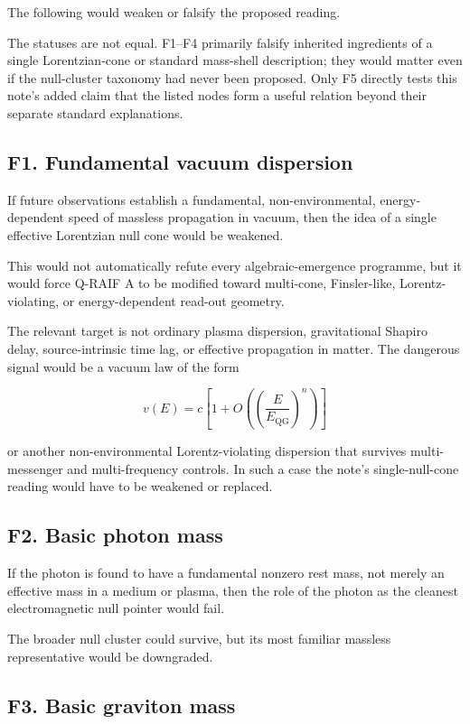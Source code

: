 \documentclass[12pt,a4paper]{article}
\theoremstyle{definition}
\theoremstyle{remark}
\begin{document}
The following would weaken or falsify the proposed reading.

The statuses are not equal.  F1--F4 primarily falsify inherited ingredients of a single Lorentzian-cone or standard mass-shell description; they would matter even if the null-cluster taxonomy had never been proposed.  Only F5 directly tests this note's added claim that the listed nodes form a useful relation beyond their separate standard explanations.

\subsection{F1. Fundamental vacuum
dispersion}\label{f1.-fundamental-vacuum-dispersion}

If future observations establish a fundamental, non-environmental,
energy-dependent speed of massless propagation in vacuum, then the idea
of a single effective Lorentzian null cone would be weakened.

This would not automatically refute every algebraic-emergence programme,
but it would force Q-RAIF A to be modified toward multi-cone,
Finsler-like, Lorentz-violating, or energy-dependent read-out geometry.

The relevant target is not ordinary plasma dispersion, gravitational
Shapiro delay, source-intrinsic time lag, or effective propagation in
matter. The dangerous signal would be a vacuum law of the form

\[
v(E)=c\left[1+O\!\left(\left(\frac{E}{E_{\mathrm{QG}}}\right)^n\right)\right]
\]

or another non-environmental Lorentz-violating dispersion that survives
multi-messenger and multi-frequency controls. In such a case the note's
single-null-cone reading would have to be weakened or replaced.

\subsection{F2. Basic photon mass}\label{f2.-basic-photon-mass}

If the photon is found to have a fundamental nonzero rest mass, not
merely an effective mass in a medium or plasma, then the role of the
photon as the cleanest electromagnetic null pointer would fail.

The broader null cluster could survive, but its most familiar massless
representative would be downgraded.

\subsection{F3. Basic graviton mass}\label{f3.-basic-graviton-mass}
\end{document}
